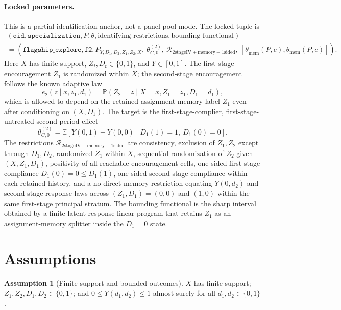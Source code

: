 \documentclass[11pt]{article}
\newcommand{\E}{\mathbb{E}}
\renewcommand{\Pr}{\mathbb{P}}
\theoremstyle{definition}
\newtheorem{assumption}{Assumption}
\theoremstyle{plain}
\theoremstyle{remark}
\begin{document}
\paragraph{Locked parameters.}
This is a partial-identification anchor, not a panel pool-mode.  The locked tuple is
\[
\begin{gathered}
(\texttt{qid},\texttt{specialization},P,\theta,\text{identifying restrictions},
  \text{bounding functional})\\
=
(\texttt{flagship\_explore},\texttt{f2},
  P_{Y,D_1,D_2,Z_1,Z_2,X},\ \theta_{C,0}^{(2)},\
  \mathcal{R}_{\mathrm{2stageIV+memory+1sided}},\
  [\underline\theta_{\mathrm{mem}}(P,e),\overline\theta_{\mathrm{mem}}(P,e)]) .
\end{gathered}
\]
Here \(X\) has finite support, \(Z_t,D_t\in\{0,1\}\), and \(Y\in[0,1]\).  The first-stage encouragement \(Z_1\) is randomized within \(X\); the second-stage encouragement follows the known adaptive law
\[
e_2(z\mid x,z_1,d_1)=\Pr(Z_2=z\mid X=x,Z_1=z_1,D_1=d_1),
\]
which is allowed to depend on the retained assignment-memory label \(Z_1\) even after conditioning on \((X,D_1)\).  The target is the first-stage-complier, first-stage-untreated second-period effect
\[
\theta_{C,0}^{(2)}
=\E\!\left[Y(0,1)-Y(0,0)\mid D_1(1)=1,\ D_1(0)=0\right].
\]
The restrictions \(\mathcal{R}_{\mathrm{2stageIV+memory+1sided}}\) are consistency, exclusion of \(Z_1,Z_2\) except through \(D_1,D_2\), randomized \(Z_1\) within \(X\), sequential randomization of \(Z_2\) given \((X,Z_1,D_1)\), positivity of all reachable encouragement cells, one-sided first-stage compliance \(D_1(0)=0\le D_1(1)\), one-sided second-stage compliance within each retained history, and a no-direct-memory restriction equating \(Y(0,d_2)\) and second-stage response laws across \((Z_1,D_1)=(0,0)\) and \((1,0)\) within the same first-stage principal stratum.  The bounding functional is the sharp interval obtained by a finite latent-response linear program that retains \(Z_1\) as an assignment-memory splitter inside the \(D_1=0\) state.

\section{Assumptions}
\begin{assumption}[Finite support and bounded outcomes]\label{ass:finite-bounded}
\(X\) has finite support; \(Z_1,Z_2,D_1,D_2\in\{0,1\}\); and \(0\le Y(d_1,d_2)\le1\) almost surely for all \(d_1,d_2\in\{0,1\}\).
\end{assumption}
\end{document}
